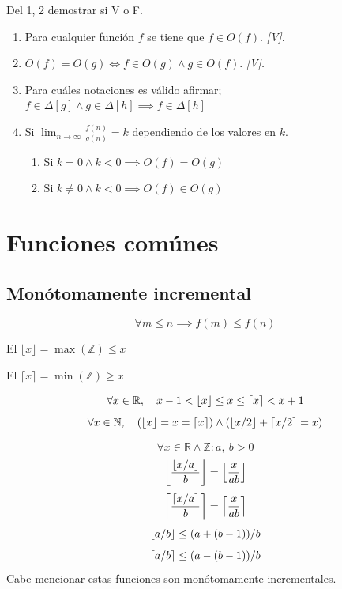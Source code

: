 \begin{example}[Ejercicio]
	Del 1, 2 demostrar si V o F.
	\begin{enumerate}
		\item Para cualquier función $f$ se tiene que $f\in O(f)$. \textit{[V].}
		\item $O(f)=O(g)\iff f\in O(g)\land g\in O(f)$. \textit{[V].}
		\item Para cuáles notaciones es válido afirmar; $f\in \Delta[g]\land g\in\Delta[h]\implies f\in\Delta[h]$
		\item Si $\lim_{n\to\infty}\frac{f(n)}{g(n)}=k$ dependiendo de los valores en $k$.
		      \begin{enumerate}
			      \item Si $k=0\land k<0\implies O(f)=O(g)$
			      \item Si $k\neq0\land k<0\implies O(f)\in O(g)$
		      \end{enumerate}
	\end{enumerate}
\end{example}





\section{Funciones comúnes}
\subsection{Monótomamente incremental}
\begin{definition}
	$$\forall m\le   n \implies f(m)\le  f(n)$$
\end{definition}

\begin{definition}
	El $\lfloor x\rfloor=\max(\mathbb{Z})\le x$
\end{definition}
\begin{definition}
	El $\lceil x\rceil=\min(\mathbb{Z})\ge x$
\end{definition}
$$
	\forall x\in\mathbb{R},\quad x-1<\left\lfloor x \right\rfloor\le x\le \left\lceil x \right\rceil<x+1
$$ $$
	\forall x\in\mathbb{N},\quad (\left\lfloor x \right\rfloor=x= \left\lceil x \right\rceil)\land (\left\lfloor x/2 \right\rfloor+\left\lceil x/2 \right\rceil=x)
$$
\begin{theorem}
	$$\forall x\in\mathbb R \land \mathbb Z:a,~b>0 $$
	$$ \left\lfloor \frac{\left\lfloor x/a \right\rfloor}b \right\rfloor=\left\lfloor \frac x{ab} \right\rfloor $$
	$$ \left\lceil \frac{\left\lceil x/a \right\rceil}b \right\rceil=\left\lceil \frac x{ab} \right\rceil $$
	$$ \left\lfloor a/b \right\rfloor\le (a+(b-1))/b $$
	$$ \left\lceil a/b \right\rceil\le (a-(b-1))/b $$
	Cabe mencionar estas funciones son monótomamente incrementales.
\end{theorem}

